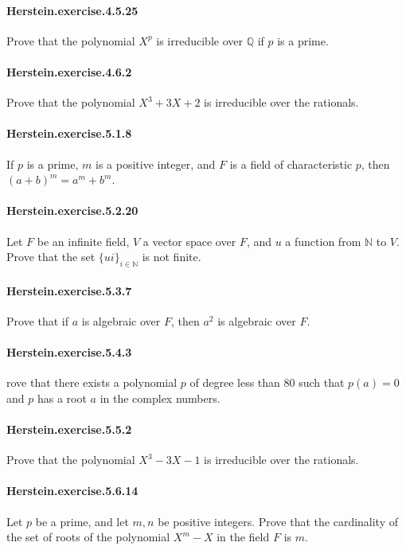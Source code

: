 \documentclass{article}
\begin{document}
\paragraph{Herstein.exercise.4.5.25} Prove that the polynomial $X^p$ is irreducible over $\mathbb{Q}$ if $p$ is a prime.

\paragraph{Herstein.exercise.4.6.2} Prove that the polynomial $X^3 + 3X + 2$ is irreducible over the rationals.

\paragraph{Herstein.exercise.5.1.8} If $p$ is a prime, $m$ is a positive integer, and $F$ is a field of characteristic $p$, then $(a + b)^m = a^m + b^m$.

\paragraph{Herstein.exercise.5.2.20} Let $F$ be an infinite field, $V$ a vector space over $F$, and $u$ a function from $\mathbb{N}$ to $V$. Prove that the set $\{u i\}_{i\in\mathbb{N}}$ is not finite.

\paragraph{Herstein.exercise.5.3.7} Prove that if $a$ is algebraic over $F$, then $a^2$ is algebraic over $F$.

\paragraph{Herstein.exercise.5.4.3} rove that there exists a polynomial $p$ of degree less than 80 such that $p(a)=0$ and $p$ has a root $a$ in the complex numbers.

\paragraph{Herstein.exercise.5.5.2} Prove that the polynomial $X^3 - 3X - 1$ is irreducible over the rationals.

\paragraph{Herstein.exercise.5.6.14} Let $p$ be a prime, and let $m, n$ be positive integers. Prove that the cardinality of the set of roots of the polynomial $X^m - X$ in the field $F$ is $m$.
\end{document}
